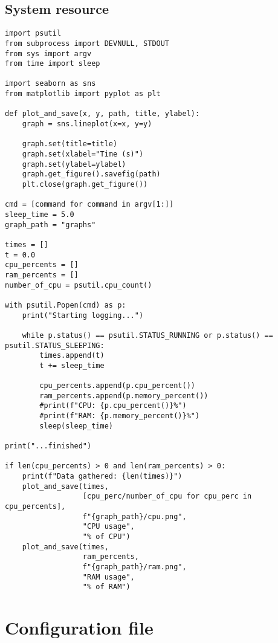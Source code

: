 \documentclass[../thesis.tex]{subfiles}
\begin{document}
\section{System resource}\label{appendix:syste_resource_script}
\begin{lstlisting}[caption=Python script to collect system resource usage by a process]
import psutil
from subprocess import DEVNULL, STDOUT
from sys import argv
from time import sleep

import seaborn as sns
from matplotlib import pyplot as plt

def plot_and_save(x, y, path, title, ylabel):
    graph = sns.lineplot(x=x, y=y)

    graph.set(title=title)
    graph.set(xlabel="Time (s)")
    graph.set(ylabel=ylabel)
    graph.get_figure().savefig(path)
    plt.close(graph.get_figure())

cmd = [command for command in argv[1:]]
sleep_time = 5.0
graph_path = "graphs"

times = []
t = 0.0
cpu_percents = []
ram_percents = []
number_of_cpu = psutil.cpu_count()

with psutil.Popen(cmd) as p:
    print("Starting logging...")

    while p.status() == psutil.STATUS_RUNNING or p.status() == psutil.STATUS_SLEEPING:
        times.append(t)
        t += sleep_time

        cpu_percents.append(p.cpu_percent())
        ram_percents.append(p.memory_percent())
        #print(f"CPU: {p.cpu_percent()}%")
        #print(f"RAM: {p.memory_percent()}%")
        sleep(sleep_time)

print("...finished")

if len(cpu_percents) > 0 and len(ram_percents) > 0:
    print(f"Data gathered: {len(times)}")
    plot_and_save(times,
                  [cpu_perc/number_of_cpu for cpu_perc in cpu_percents],
                  f"{graph_path}/cpu.png",
                  "CPU usage",
                  "% of CPU")
    plot_and_save(times,
                  ram_percents,
                  f"{graph_path}/ram.png",
                  "RAM usage",
                  "% of RAM")
\end{lstlisting}

\chapter{Configuration file}
\end{document}
